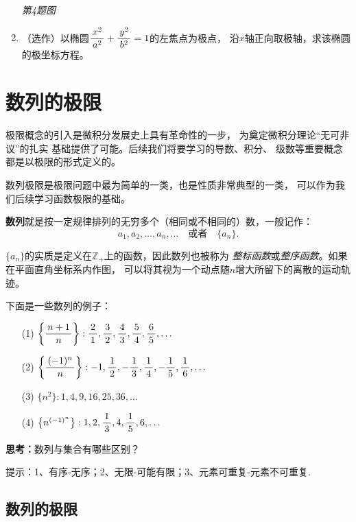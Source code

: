 \begin{ext}
\begin{enumerate}
\begin{center}
		\it \small 第4题图
	\end{center}
	\item （选作）以椭圆$\displaystyle\frac{\,{x^2}\,}{\,{a^2}\,}+\displaystyle\frac{\,{y^2}\,}{\,{b^2}\,}=1$的左焦点为极点，
	沿$x$轴正向取极轴，求该椭圆的极坐标方程。
	\end{enumerate}
\end{ext}

\newpage
\section{数列的极限}

极限概念的引入是微积分发展史上具有革命性的一步，
为奠定微积分理论“无可非议”的扎实
基础提供了可能。后续我们将要学习的导数、积分、
级数等重要概念都是以极限的形式定义的。

数列极限是极限问题中最为简单的一类，也是性质非常典型的一类，
可以作为我们后续学习函数极限的基础。

\bs
{\bf 数列}就是按一定规律排列的无穷多个（相同或不相同的）数，一般记作：
$$a_1,a_2,\ldots,a_n,\ldots\quad\mbox{或者}\quad\{a_n\}.$$

$\{a_n\}$的实质是定义在$\mathbb{Z}_+$上的函数，因此数列也被称为
{\it 整标函数}或{\it 整序函数}。如果在平面直角坐标系内作图，
可以将其视为一个动点随$n$增大所留下的离散的运动轨迹。

下面是一些数列的例子：
\begin{enumerate}[(1)]
  \setlength{\itemindent}{1cm}
  \item[(1)] $\left\{\displaystyle\frac{\,{n+1}\,}{\,{n}\,}\right\}:\displaystyle\frac{\,{2}\,}{\,{1}\,},\displaystyle\frac{\,{3}\,}{\,{2}\,},\displaystyle\frac{\,{4}\,}{\,{3}\,},\displaystyle\frac{\,{5}\,}{\,{4}\,},\displaystyle\frac{\,{6}\,}{\,{5}\,},\ldots$
  \item[(2)] $\left\{\displaystyle\frac{\,{(-1)^n}\,}{\,{n}\,}\right\}:-1,\displaystyle\frac{\,{1}\,}{\,{2}\,},-\displaystyle\frac{\,{1}\,}{\,{3}\,},\displaystyle\frac{\,{1}\,}{\,{4}\,},-\displaystyle\frac{\,{1}\,}{\,{5}\,},\displaystyle\frac{\,{1}\,}{\,{6}\,},\ldots$
  \item[(3)] $\{n^2\}:1,4,9,16,25,36,\ldots$
  \item[(4)] $\left\{n^{(-1)^n}\right\}:1,2,\displaystyle\frac{\,{1}\,}{\,{3}\,},4,\displaystyle\frac{\,{1}\,}{\,{5}\,},6,\ldots$
\end{enumerate}

\bs
{\bf 思考：}数列与集合有哪些区别？

\ifhint
提示：1、有序-无序；2、无限-可能有限；3、元素可重复-元素不可重复.
\fi

\subsection{数列的极限}

